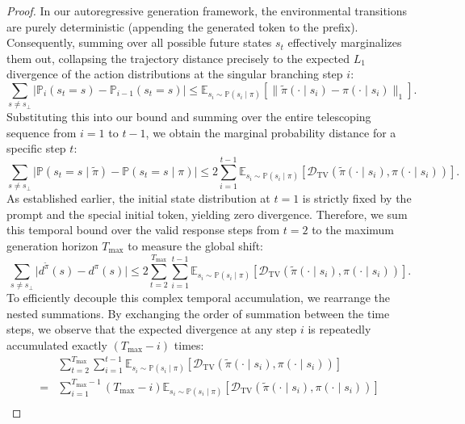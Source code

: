 \documentclass{article}
\theoremstyle{plain}
\theoremstyle{definition}
\theoremstyle{remark}
\begin{document}
\begin{proof}
	In our autoregressive generation framework, the environmental transitions are purely deterministic (appending the generated token to the prefix). Consequently, summing over all possible future states $s_t$ effectively marginalizes them out, collapsing the trajectory distance precisely to the expected $L_1$ divergence of the action distributions at the singular branching step $i$:
	\begin{equation}
		\sum_{s \neq s_\bot}\lvert\mathbb{P}_i(s_t = s) - \mathbb{P}_{i-1}(s_t = s)\rvert \leq \mathbb{E}_{s_i \sim \mathbb{P}(s_i \mid \pi)}\left[ \lVert\tilde{\pi}(\cdot \mid s_i) - \pi(\cdot \mid s_i)\rVert_1 \right].
	\end{equation}
	Substituting this into our bound and summing over the entire telescoping sequence from $i=1$ to $t-1$, we obtain the marginal probability distance for a specific step $t$:
	\begin{equation}
		\sum_{s \neq s_\bot}\lvert\mathbb{P}(s_t = s \mid \tilde{\pi}) - \mathbb{P}(s_t = s \mid \pi)\rvert \leq 2\sum_{i=1}^{t-1} \mathbb{E}_{s_i \sim \mathbb{P}(s_i \mid \pi)}\left[\mathcal{D}_{\mathrm{TV}}(\tilde{\pi}(\cdot \mid s_i), \pi(\cdot \mid s_i))\right].
	\end{equation}
	As established earlier, the initial state distribution at $t=1$ is strictly fixed by the prompt and the special initial token, yielding zero divergence. Therefore, we sum this temporal bound over the valid response steps from $t=2$ to the maximum generation horizon $T_{\max}$ to measure the global shift:
	\begin{equation}
		\sum_{s \neq s_\bot} \lvert d^{\tilde{\pi}}(s) - d^\pi(s) \rvert \leq 2\sum_{t=2}^{T_{\max}}\sum_{i=1}^{t-1} \mathbb{E}_{s_i \sim \mathbb{P}(s_i \mid \pi)}\left[\mathcal{D}_{\mathrm{TV}}(\tilde{\pi}(\cdot \mid s_i), \pi(\cdot \mid s_i))\right].
	\end{equation}
	To efficiently decouple this complex temporal accumulation, we rearrange the nested summations. By exchanging the order of summation between the time steps, we observe that the expected divergence at any step $i$ is repeatedly accumulated exactly $(T_{\max} - i)$ times:
	\begin{equation}
		\begin{split}
			&\sum_{t=2}^{T_{\max}}\sum_{i=1}^{t-1} \mathbb{E}_{s_i \sim \mathbb{P}(s_i \mid \pi)}\left[\mathcal{D}_{\mathrm{TV}}(\tilde{\pi}(\cdot \mid s_i), \pi(\cdot \mid s_i))\right]\\ =& \sum_{i=1}^{T_{\max}-1} (T_{\max} - i) \mathbb{E}_{s_i \sim \mathbb{P}(s_i \mid \pi)}\left[\mathcal{D}_{\mathrm{TV}}(\tilde{\pi}(\cdot \mid s_i), \pi(\cdot \mid s_i))\right]\\

\end{split}
\end{equation}
\end{proof}
\end{document}
